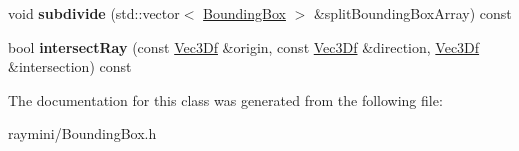 \begin{DoxyCompactItemize}
\item 
\hypertarget{class_bounding_box_a8c308fe75ccdf49206b3f2c24841b688}{
void {\bfseries subdivide} (std::vector$<$ \hyperlink{class_bounding_box}{BoundingBox} $>$ \&splitBoundingBoxArray) const }
\label{class_bounding_box_a8c308fe75ccdf49206b3f2c24841b688}

\item 
\hypertarget{class_bounding_box_aa14554dfd5978b6cfcdd948929aa673b}{
bool {\bfseries intersectRay} (const \hyperlink{class_vec3_d}{Vec3Df} \&origin, const \hyperlink{class_vec3_d}{Vec3Df} \&direction, \hyperlink{class_vec3_d}{Vec3Df} \&intersection) const }
\label{class_bounding_box_aa14554dfd5978b6cfcdd948929aa673b}

\end{DoxyCompactItemize}


The documentation for this class was generated from the following file:\begin{DoxyCompactItemize}
\item 
raymini/BoundingBox.h\end{DoxyCompactItemize}
